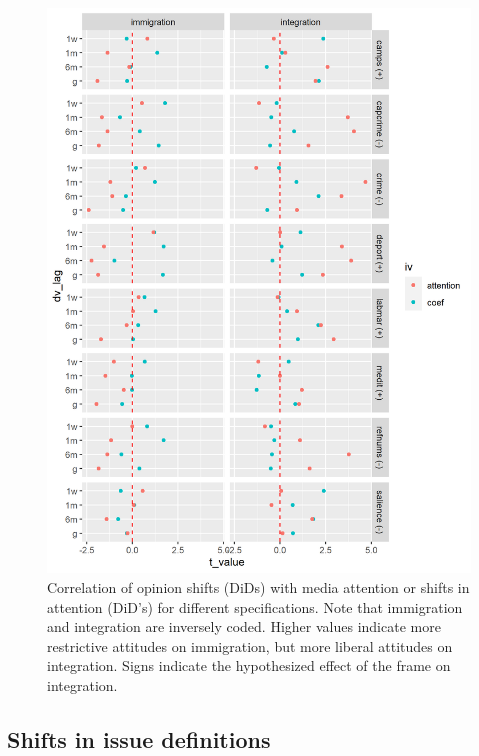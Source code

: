 \documentclass{article}
\begin{document}
\begin{figure}[!ht]
    \centering
    \includegraphics[width=\textwidth]{paper/vis/effectplot_noimp.png}
    \caption{Correlation of opinion shifts (DiDs) with media attention or shifts in attention (DiD's) for different specifications. Note that immigration and integration are inversely coded. Higher values indicate more restrictive attitudes on immigration, but more liberal attitudes on integration. Signs indicate the hypothesized effect of the frame on integration.}
    \label{fig:did_corr}
\end{figure}

\subsection{Shifts in issue definitions}

\end{document}
